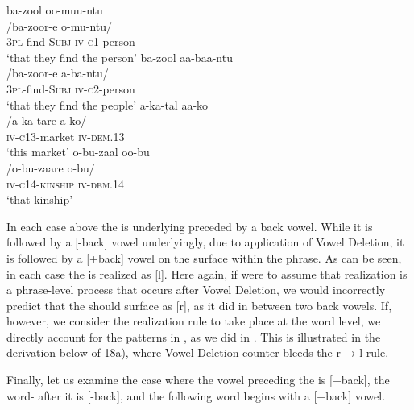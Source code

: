 \documentclass[output=paper
,newtxmath
,modfonts
,nonflat]{langsci/langscibook}
\begin{document}
\ea\label{ex:bickmore:18}
\ea\label{ex:bickmore:18a}
\glll  ba-zool oo-muu-ntu    \\
      /ba-zoor-e o-mu-ntu/	\\
\textsc{3pl-}\textup{find}\textsc{{}-Subj} \textsc{iv-c1-}\textup{person}\\
\glt      ‘that they find the person’
\ex\label{ex:bickmore:18b}
\glll  ba-zool aa-baa-ntu    \\
      /ba-zoor-e a-ba-ntu/	\\
\textsc{3pl-}\textup{find}\textsc{{}-Subj} \textsc{iv-c2-}\textup{person}\\
\glt      ‘that they find the people’
\ex\label{ex:bickmore:18c}
\glll  a-ka-tal aa-ko    \\
      /a-ka-tare a-ko/	\\
\textsc{iv-c13-}\textup{market} \textsc{iv-dem.13}\\
\glt      ‘this market’
\ex\label{ex:bickmore:18d}
\glll  o-bu-zaal oo-bu    \\
      /o-bu-zaare o-bu/	\\
\textsc{iv-c14-kinship} \textsc{iv-dem.14}\\
\glt      ‘that kinship’
\z
\z

In each case above the  is underlying preceded by a back vowel. While it is followed by a [-back] vowel underlyingly, due to application of Vowel Deletion, it is followed by a [+back] vowel on the surface within the phrase. As can be seen, in each case the  is realized as [l]. Here again, if were to assume that  realization is a phrase-level process that occurs after Vowel Deletion, we would incorrectly predict that the  should surface as [r], as it did in  between two back vowels. If, however, we consider the  realization rule to take place at the word level, we directly account for the patterns in , as we did in . This is illustrated in the derivation below of 18a), where Vowel Deletion counter-bleeds the r → l rule.

\ea\label{ex:bickmore:19}
\z

Finally, let us examine the case where the vowel preceding the  is [+back], the word- after it is [-back], and the following word begins with a [+back] vowel.
\end{document}
